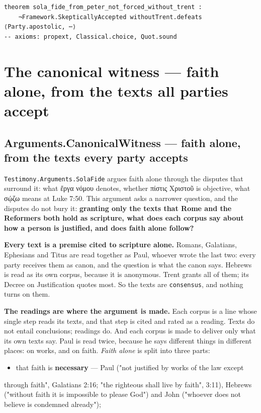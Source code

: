 \documentclass[11pt]{article}
\begin{document}
{\small\begin{verbatim}
theorem sola_fide_from_peter_not_forced_without_trent :
    ¬Framework.SkepticallyAccepted withoutTrent.defeats ⟨Party.apostolic, ⋯⟩
-- axioms: propext, Classical.choice, Quot.sound
\end{verbatim}}
\clearpage
\section*{The canonical witness — faith alone, from the texts all parties accept}

\subsection*{Arguments.CanonicalWitness — faith alone, from the texts every party accepts}
\texttt{Testimony.Arguments.Sola\allowbreak{}Fide} argues faith alone through the disputes that surround it: what ἔργα νόμου denotes, whether πίστις Χριστοῦ is objective, what σῴζω means at Luke 7:50. This argument asks a narrower question, and the disputes do not bury it: \textbf{granting only the texts that Rome and the Reformers both hold as scripture, what does each corpus say about how a person is justified, and does faith alone follow?}

\textbf{Every text is a premise cited to scripture alone.} Romans, Galatians, Ephesians and Titus are read together as Paul, whoever wrote the last two: every party receives them as canon, and the question is what the canon says. Hebrews is read as its own corpus, because it is anonymous. Trent grants all of them; its Decree on Justification quotes most. So the texts are \texttt{consensus}, and nothing turns on them.

\textbf{The readings are where the argument is made.} Each corpus is a line whose single step reads its texts, and that step is cited and rated as a reading. Texts do not entail conclusions; readings do. And each corpus is made to deliver only what its own texts say. Paul is read twice, because he says different things in different places: on works, and on faith. \emph{Faith alone} is split into three parts:

\begin{itemize}
  \item that faith is \textbf{necessary} — Paul ("not justified by works of the law except
\end{itemize}
  through faith", Galatians 2:16; "the righteous shall live by faith", 3:11),   Hebrews ("without faith it is impossible to please God") and John ("whoever   does not believe is condemned already");
\end{document}
